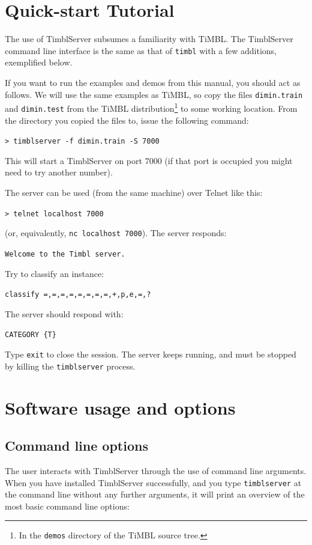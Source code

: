 \documentclass{report}
\begin{document}
\chapter{Quick-start Tutorial}
\label{tutorial}

The use of TimblServer subsumes a familiarity with TiMBL.  The
TimblServer command line interface is the same as that of {\tt timbl}
with a few additions, exemplified below.

If you want to run the examples and demos from this manual, you should
act as follows. We will use the same examples as TiMBL, so copy the
files {\tt dimin.train} and {\tt dimin.test} from the TiMBL
distribution\footnote{In the {\tt demos} directory of the TiMBL source
  tree.} to some working location. From the directory you copied the
files to, issue the following command:

{\tt > timblserver -f dimin.train -S 7000}

This will start a TimblServer on port 7000 (if that port is occupied
you might need to try another number).

The server can be used (from the same machine) over Telnet like this:

{\tt > telnet localhost 7000 }

(or, equivalently, {\tt nc localhost 7000}). The server responds:

{\tt Welcome to the Timbl server.}

Try to classify an instance:

{\tt classify =,=,=,=,=,=,=,=,+,p,e,=,? }

The server should respond with:

{\tt CATEGORY \{T\} }

Type {\tt exit} to close the session. The server keeps running, and
must be stopped by killing the {\tt timblserver} process.

\chapter{Software usage and options}
\label{reference}

\section{Command line options}
\label{commandline}

The user interacts with TimblServer through the use of command line
arguments.  When you have installed TimblServer successfully, and you
type {\tt timblserver} at the command line without any further
arguments, it will print an overview of the most basic command line
options:
\end{document}
